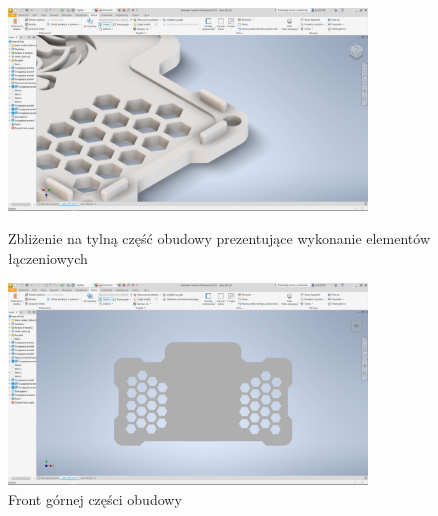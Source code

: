 \clearpage
\begin{figure}[htbp]
\centering
	\includegraphics[width=0.85\textwidth]{root/cover_top_closeup_back.png}
	\caption{Zbliżenie na tylną część obudowy prezentujące wykonanie elementów łączeniowych}
	\vspace{1cm}
	\includegraphics[width=0.85\textwidth]{root/cover_top_front.png}
	\caption{Front górnej części obudowy}
\end{figure}


